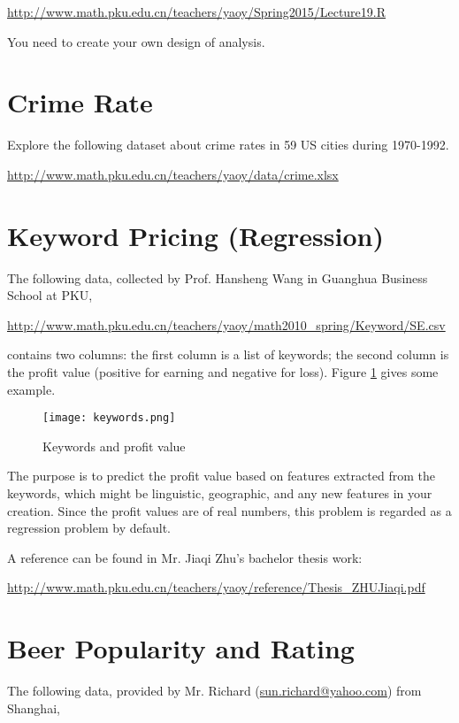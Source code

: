\documentclass[11pt]{article}
\begin{document}
\url{http://www.math.pku.edu.cn/teachers/yaoy/Spring2015/Lecture19.R}

You need to create your own design of analysis.

\section{Crime Rate}
Explore the following dataset about crime rates in 59 US cities during 1970-1992.

\url{http://www.math.pku.edu.cn/teachers/yaoy/data/crime.xlsx}

\section{Keyword Pricing (Regression)}

The following data, collected by Prof. Hansheng Wang in Guanghua Business School at PKU,

\url{http://www.math.pku.edu.cn/teachers/yaoy/math2010_spring/Keyword/SE.csv}

\noindent contains two columns: the first column is a list of keywords; the second column is the profit value (positive for earning and negative for loss). Figure \ref{fig:keywords} gives some example.

\begin{figure}[htbp]
\begin{center}
\texttt{[image: keywords.png]}
\caption{Keywords and profit value}
\label{fig:keywords}
\end{center}
\end{figure}

The purpose is to predict the profit value based on features extracted from the keywords, which might be linguistic, geographic, and any new features in your creation. Since the profit values are of real numbers, this problem is regarded as a regression problem by default.

A reference can be found in Mr. Jiaqi Zhu's bachelor thesis work:

\url{http://www.math.pku.edu.cn/teachers/yaoy/reference/Thesis_ZHUJiaqi.pdf}

\section{Beer Popularity and Rating}

The following data, provided by Mr. Richard (\url{sun.richard@yahoo.com}) from Shanghai,
\end{document}

